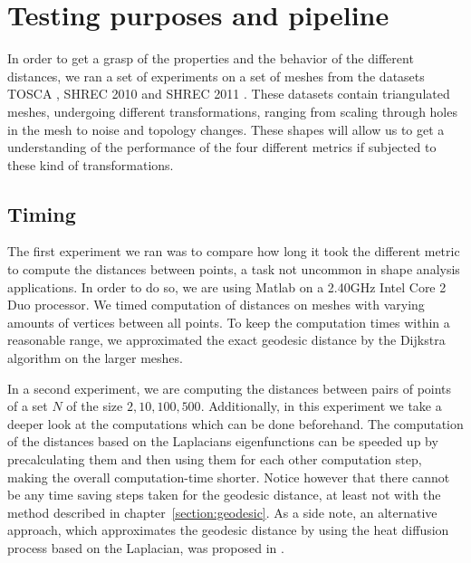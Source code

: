 \chapter{Testing purposes and pipeline}
\label{chapter:testing}


In order to get a grasp of the properties and the behavior of the different distances, we ran a set of experiments on a set of meshes from the datasets TOSCA \cite{bronstein2008numerical}, SHREC 2010 \cite{bronstein2010shrec} and SHREC 2011 \cite{dutagaci2011shrec}.
These datasets contain triangulated meshes, undergoing different transformations, ranging from scaling through holes in the mesh to noise and topology changes.
These shapes will allow us to get a understanding of the performance of the four different metrics if subjected to these kind of transformations.

\section{Timing}

The first experiment we ran was to compare how long it took the different metric to compute the distances between points, a task not uncommon in shape analysis applications.
In order to do so, we are using Matlab on a 2.40GHz Intel Core 2 Duo processor.
We timed computation of distances on meshes with varying amounts of vertices between all points.
To keep the computation times within a reasonable range, we approximated the exact geodesic distance by the Dijkstra algorithm on the larger meshes.

In a second experiment, we are computing the distances between pairs of points of a set $N$ of the size $2,10,100,500$.
Additionally, in this experiment we take a deeper look at the computations which can be done beforehand.
The computation of the distances based on the Laplacians eigenfunctions can be speeded up by precalculating them and then using them for each other computation step, making the overall computation-time shorter.
Notice however that there cannot be any time saving steps taken for the geodesic distance, at least not with the method described in chapter~\ref{section:geodesic}.
As a side note, an alternative approach, which approximates the geodesic distance by using the heat diffusion process based on the Laplacian, was proposed in \cite{crane2013geodesics}.

